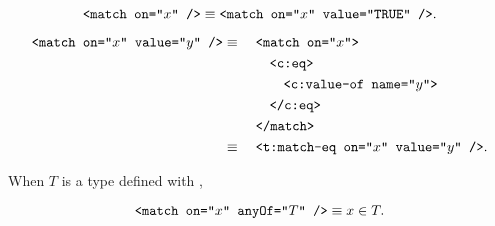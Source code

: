 \begin{definition}
  \begin{equation*}
    \texttt{<match on="$x$" />}
      \equiv \texttt{<match on="$x$" value="TRUE" />}.
  \end{equation*}
\end{definition}

\begin{definition}
  \begin{alignat*}{2}
    \texttt{<match on="$x$" value="$y$" />}
      &\equiv {}&&\texttt{<match on="$x$">} \\
      &         &&\quad \texttt{<c:eq>} \\
      &         &&\quad\quad \texttt{<c:value-of name="$y$">} \\
      &         &&\quad \texttt{</c:eq>} \\
      &         &&\texttt{</match>} \\
      &\equiv {}&&\texttt{<t:match-eq on="$x$" value="$y$" />}.
  \end{alignat*}
\end{definition}

\begin{definition}
  When $T$ is a type defined with ,

  \begin{equation*}
    \texttt{<match on="$x$" anyOf="$T$" />} \equiv x \in T.
  \end{equation*}
\end{definition}
